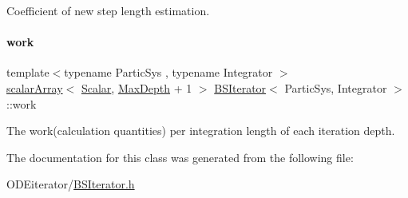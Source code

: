 Coefficient of new step length estimation. 

\mbox{\label{class_b_s_iterator_ac2a338d6c3e5014d529666032d34c987}} 
\paragraph{\texorpdfstring{work}{work}}
{\footnotesize\ttfamily template$<$typename Partic\+Sys , typename Integrator $>$ \\
\mbox{\hyperlink{class_b_s_iterator_ab0aa7c10b56500273af05dcd85fd8389}{scalar\+Array}}$<$ \mbox{\hyperlink{class_b_s_iterator_a7857f8ff9032955ea4dcc22cd18ca7a1}{Scalar}}, \mbox{\hyperlink{class_b_s_iterator_a39409b9a12d4854d101ce59a0efc0f74}{Max\+Depth}} + 1 $>$ \mbox{\hyperlink{class_b_s_iterator}{B\+S\+Iterator}}$<$ Partic\+Sys, Integrator $>$\+::work\hspace{0.3cm}{\ttfamily [private]}}



The work(calculation quantities) per integration length of each iteration depth. 



The documentation for this class was generated from the following file\+:\begin{DoxyCompactItemize}
\item 
O\+D\+Eiterator/\mbox{\hyperlink{_b_s_iterator_8h}{B\+S\+Iterator.\+h}}\end{DoxyCompactItemize}
